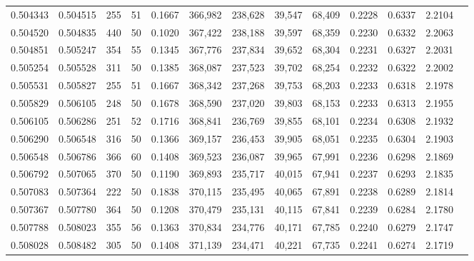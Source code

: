 \begin{tabular}{rrrrrrrrrrrrr}
0.504343 & 0.504515 &   255 &  51 &                                     0.1667 & 366,982 & 238,628 &  39,547 &  68,409 & 0.2228 & 0.6337 & 2.2104 \\
0.504520 & 0.504835 &   440 &  50 &                                     0.1020 & 367,422 & 238,188 &  39,597 &  68,359 & 0.2230 & 0.6332 & 2.2063 \\
0.504851 & 0.505247 &   354 &  55 &                                     0.1345 & 367,776 & 237,834 &  39,652 &  68,304 & 0.2231 & 0.6327 & 2.2031 \\
0.505254 & 0.505528 &   311 &  50 &                                     0.1385 & 368,087 & 237,523 &  39,702 &  68,254 & 0.2232 & 0.6322 & 2.2002 \\
0.505531 & 0.505827 &   255 &  51 &                                     0.1667 & 368,342 & 237,268 &  39,753 &  68,203 & 0.2233 & 0.6318 & 2.1978 \\
0.505829 & 0.506105 &   248 &  50 &                                     0.1678 & 368,590 & 237,020 &  39,803 &  68,153 & 0.2233 & 0.6313 & 2.1955 \\
0.506105 & 0.506286 &   251 &  52 &                                     0.1716 & 368,841 & 236,769 &  39,855 &  68,101 & 0.2234 & 0.6308 & 2.1932 \\
0.506290 & 0.506548 &   316 &  50 &                                     0.1366 & 369,157 & 236,453 &  39,905 &  68,051 & 0.2235 & 0.6304 & 2.1903 \\
0.506548 & 0.506786 &   366 &  60 &                                     0.1408 & 369,523 & 236,087 &  39,965 &  67,991 & 0.2236 & 0.6298 & 2.1869 \\
0.506792 & 0.507065 &   370 &  50 &                                     0.1190 & 369,893 & 235,717 &  40,015 &  67,941 & 0.2237 & 0.6293 & 2.1835 \\
0.507083 & 0.507364 &   222 &  50 &                                     0.1838 & 370,115 & 235,495 &  40,065 &  67,891 & 0.2238 & 0.6289 & 2.1814 \\
0.507367 & 0.507780 &   364 &  50 &                                     0.1208 & 370,479 & 235,131 &  40,115 &  67,841 & 0.2239 & 0.6284 & 2.1780 \\
0.507788 & 0.508023 &   355 &  56 &                                     0.1363 & 370,834 & 234,776 &  40,171 &  67,785 & 0.2240 & 0.6279 & 2.1747 \\
0.508028 & 0.508482 &   305 &  50 &                                     0.1408 & 371,139 & 234,471 &  40,221 &  67,735 & 0.2241 & 0.6274 & 2.1719 \\

\end{tabular}
